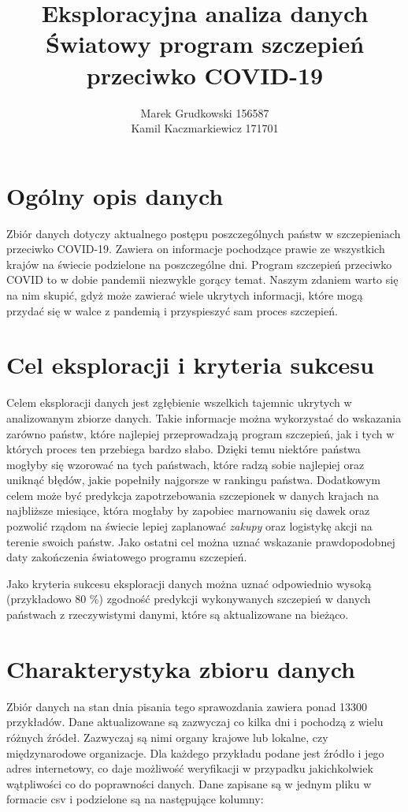 \documentclass[12pt, oneside]{article}
\title{
	Eksploracyjna analiza danych \\
	Światowy program szczepień przeciwko COVID-19
}
\author{
	Marek Grudkowski 156587
	\\
	Kamil Kaczmarkiewicz 171701
}
\begin{document}
\maketitle

\section{Ogólny opis danych}

Zbiór danych dotyczy aktualnego postępu poszczególnych państw w szczepieniach przeciwko COVID-19. Zawiera on informacje pochodzące prawie ze wszystkich krajów na świecie podzielone na poszczególne dni. Program szczepień przeciwko COVID to w dobie pandemii niezwykle gorący temat. Naszym zdaniem warto się na nim skupić, gdyż może zawierać wiele ukrytych informacji, które mogą przydać się w walce z pandemią i przyspieszyć sam proces szczepień. 

\section{Cel eksploracji i kryteria sukcesu}

Celem eksploracji danych jest zgłębienie wszelkich tajemnic ukrytych w analizowanym zbiorze danych. Takie informacje można wykorzystać do wskazania zarówno państw, które najlepiej przeprowadzają program szczepień, jak i tych w których proces ten przebiega bardzo słabo. Dzięki temu niektóre państwa mogłyby się wzorować na tych państwach, które radzą sobie najlepiej oraz uniknąć błędów, jakie popełniły najgorsze w rankingu państwa.  Dodatkowym celem może być predykcja zapotrzebowania szczepionek w danych krajach na najbliższe miesiące, która mogłaby by zapobiec marnowaniu się dawek oraz pozwolić rządom na świecie lepiej zaplanować \textit{zakupy} oraz logistykę akcji na terenie swoich państw.  Jako ostatni cel można uznać wskazanie prawdopodobnej daty zakończenia światowego programu szczepień. 
\par
Jako kryteria sukcesu eksploracji danych można uznać odpowiednio wysoką (przykładowo $80$ \%) zgodność predykcji wykonywanych szczepień w danych państwach z rzeczywistymi danymi, które są aktualizowane na bieżąco. 

\newpage

\section{Charakterystyka zbioru danych}
Zbiór danych na stan dnia pisania tego sprawozdania zawiera ponad 13300 przykładów. Dane aktualizowane są zazwyczaj co kilka dni i pochodzą z wielu różnych źródeł. Zazwyczaj są nimi organy krajowe lub lokalne, czy międzynarodowe organizacje. Dla każdego przykładu podane jest źródło i jego adres internetowy, co daje możliwość weryfikacji w przypadku jakichkolwiek wątpliwości co do poprawności danych. Dane zapisane są w jednym pliku w formacie csv i podzielone są na następujące kolumny:
\end{document}
